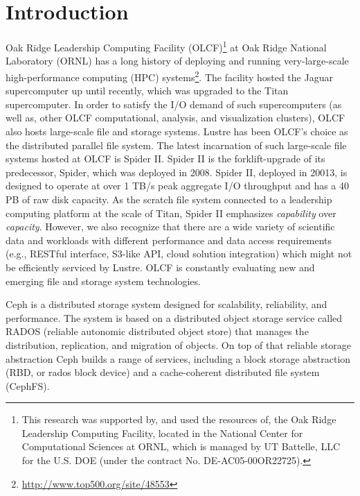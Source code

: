 \section{Introduction}

Oak Ridge Leadership Computing Facility (OLCF)\footnote{This research was
supported by, and used the resources of, the Oak Ridge Leadership Computing
Facility, located in the National Center for Computational Sciences at ORNL,
which is managed by UT Battelle, LLC for the U.S. DOE (under the contract No.
DE-AC05-00OR22725).} at Oak Ridge National Laboratory (ORNL) has a long history
of deploying and running very-large-scale high-performance computing (HPC)
systems\footnote{\url{http://www.top500.org/site/48553}}. The facility hosted
the Jaguar supercomputer up until recently, which was upgraded to the Titan
supercomputer. In order to satisfy the I/O demand of such supercomputers (as
well as, other OLCF computational, analysis, and visualization clusters), OLCF
also hosts large-scale file and storage systems. Lustre has been OLCF's choice
as the distributed parallel file system.  The latest incarnation of such
large-scale file systems hosted at OLCF is Spider II\cite{spider2}. Spider II
is the forklift-upgrade of its predecessor, Spider, which was deployed in 2008.
Spider II, deployed in 20013, is designed to operate at over 1 TB/s peak
aggregate I/O throughput and has a 40 PB of raw disk capacity. As the scratch
file system connected to a leadership computing platform at the scale of Titan,
Spider II emphasizes \textit{capability} over \textit{capacity}. However, we
also recognize that there are a wide variety of scientific data and workloads
with different performance and data access requirements (e.g., RESTful
interface, S3-like API, cloud solution integration) which might not be
efficiently serviced by Lustre. OLCF is constantly evaluating new and emerging
file and storage system technologies.  

Ceph\cite{Weil:2006:Ceph} is a distributed storage system designed for
scalability, reliability, and performance.  The system is based on a
distributed object storage service called RADOS (reliable autonomic distributed
object store) that manages the distribution, replication, and migration of
objects.  On top of that reliable storage abstraction Ceph builds a range of
services, including a block storage abstraction (RBD, or rados block device)
and a cache-coherent distributed file system (CephFS).

